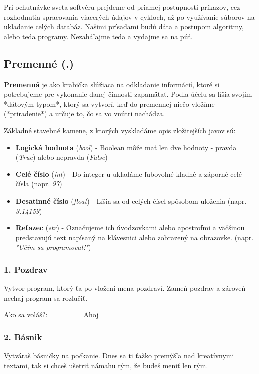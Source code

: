 Pri ochutnávke sveta softvéru prejdeme od priamej postupnosti príkazov, cez rozhodnutia spracovania viacerých údajov v cykloch, až po využívanie súborov na ukladanie celých databáz. Našimi prísadami budú dáta a postupom algoritmy, alebo teda programy. Nezaháľajme teda a vydajme sa na púť.

\subsection{Premenné (.)}
\textbf{Premenná} je ako krabička slúžiaca na odkladanie informácií, ktoré si potrebujeme pre vykonanie danej činnosti zapamätať. Podľa účelu sa líšia svojim *dátovým typom*, ktorý sa vytvorí, keď do premennej niečo vložíme (*priradenie*) a určuje to, čo sa vo vnútri nachádza.

Základné stavebné kamene, z ktorých vyskladáme opis zložitejších javov sú:

\begin{itemize}
\itemsep0pt
\item \textbf{Logická hodnota} (\textit{bool}) - Boolean môže mať len dve hodnoty - pravda (\textit{True}) alebo nepravda (\textit{False})
\item \textbf{Celé číslo} (\textit{int}) - Do integer-u ukladáme ľubovolné kladné a záporné celé čísla (napr. \textit{97})
\item \textbf{Desatinné číslo} (\textit{float}) - Líšia sa od celých čísel spôsobom uloženia (napr. \textit{3.14159})
\item \textbf{Reťazec} (\textit{str}) - Označujeme ich úvodzovkami alebo apostrofmi a väčšinou predstavujú text napísaný na klávesnici alebo zobrazený na obrazovke. (napr. \textit{"Učím sa programovať!"})
\end{itemize}

\subsubsection*{1. Pozdrav}
Vytvor program, ktorý ťa po vložení mena pozdraví. Zameň pozdrav a zároveň nechaj program sa rozlučiť.

\begin{code}
Ako sa voláš?: ______
Ahoj ______
\end{code}

\subsubsection*{2. Básnik}
Vytváraš básničky na počkanie. Dnes sa ti ťažko premýšľa nad kreatívnymi textami, tak si chceš ušetriť námahu tým, že budeš meniť len rým.

